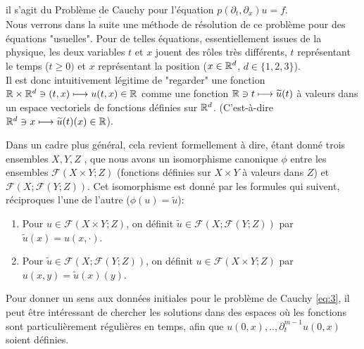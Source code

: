 \documentclass[french,a4paper,10pt]{article}
\begin{document}
            il s'agit du $\underline{\text{Problème de Cauchy}}$ pour l'équation $p(\partial_t,\partial_x)u=f$.\\

            Nous verrons dans la suite une méthode de résolution de ce problème pour des équations "usuelles".
            Pour de telles équations, essentiellement issues de la physique, les deux variables $t$ et $x$ jouent des rôles très différents, $t$ représentant le temps ($t \geq 0)$ et $x$ représentant la position ($x \in \mathbb{R}^d$, $d \in \{ 1,2,3\}$).\\[2mm]

            Il est donc intuitivement légitime de "regarder" une fonction $\mathbb{R} \times \mathbb{R}^d \ni (t,x) \longmapsto u(t,x) \in \mathbb{R}$ comme une fonction $\mathbb{R} \ni t \longmapsto \widetilde{u}(t)$ à valeurs dans un espace vectoriels de fonctions définies sur $\mathbb{R}^d$. (C'est-à-dire $\mathbb{R}^d \ni x \longmapsto \widetilde{u}(t)(x) \in \mathbb{R}$).

            Dans un cadre plus général, cela revient formellement à dire, étant donné trois ensembles $X,Y,Z$ , que nous avons un isomorphisme canonique $\phi$ entre les ensembles $\mathscr{F}(X\times Y;Z)$ (fonctions définies sur $X\times Y$ à valeurs dans $Z$) et $\mathscr{F}(X;\mathscr{F}(Y;Z))$. Cet isomorphisme est donné par les formules qui suivent, réciproques l'une de l'autre ($\phi(u)=\widetilde{u}$):

            \begin{enumerate}
                \item Pour $u \in \mathscr{F}(X\times Y;Z)$, on définit $\widetilde{u} \in \mathscr{F}(X;\mathscr{F}(Y;Z))$ par $\widetilde{u}(x) = u(x,\cdot)$.

                \item Pour $\widetilde{u} \in \mathscr{F}(X;\mathscr{F}(Y;Z))$, on définit $u \in \mathscr{F}(X\times Y;Z)$ par $u(x,y)=\widetilde{u}(x)(y)$.
            \end{enumerate}

            Pour donner un sens aux données initiales pour le problème de Cauchy \eqref{eq:3}, il peut être intéressant de chercher les solutions dans des espaces où les fonctions sont particulièrement régulières en temps, afin que $u(0,x),..,\partial_t^{m-1}u(0,x)$ soient définies.
\end{document}
